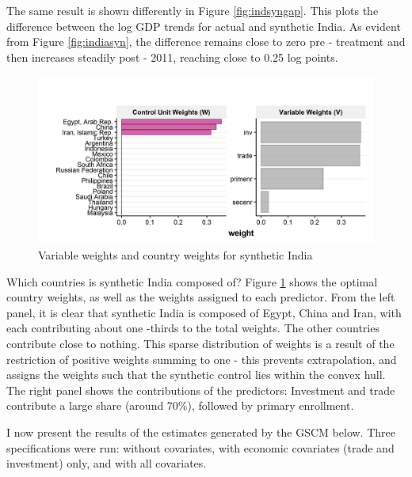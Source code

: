 \documentclass[12pt,nobind, a4paper]{reedthesis}
\begin{document}
 The same result is shown differently in Figure \ref{fig:indsyngap}. This plots the difference between the log GDP trends for actual and synthetic India. As evident from Figure \ref{fig:indiasyn}, the difference remains close to zero pre - treatment and then increases steadily post - 2011, reaching close to 0.25 log points.
 \linebreak

 \newpage
 \begin{figure}

 {\centering \includegraphics[width=1\linewidth]{figure/weights} 

 }

 \caption{Variable weights and country weights for synthetic India}\label{fig:weights}
 \end{figure}
 Which countries is synthetic India composed of? Figure \ref{fig:weights} shows the optimal country weights, as well as the weights assigned to each predictor. From the left panel, it is clear that synthetic India is composed of Egypt, China and Iran, with each contributing about one -thirds to the total weights. The other countries contribute close to nothing. This sparse distribution of weights is a result of the restriction of positive weights summing to one - this prevents extrapolation, and assigns the weights such that the synthetic control lies within the convex hull. The right panel shows the contributions of the predictors: Investment and trade contribute a large share (around 70\%), followed by primary enrollment.
 \linebreak

 I now present the results of the estimates generated by the GSCM below. Three specifications were run: without covariates, with economic covariates (trade and investment) only, and with all covariates.
\end{document}
